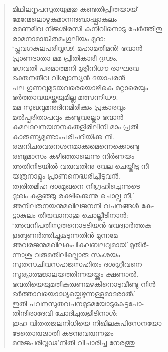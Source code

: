 \begin{verse}
മിഥിലനൃപസുതയുമതു കണ്ടതിപ്രീതയായ്\\
മേന്മേലൊഴുകുമാനന്ദബാഷ്പാകുലം\\
രമണമിവ നിജശിരസി കനിവിനൊടു ചേര്‍ത്തിതു\\
രാമനാമാങ്കിതമംഗുലീയം മുദാ:\\
‘പ്ലവഗകുലപരിവൃഢ! മഹാമതിമന്‍! ഭവാന്‍\\
പ്രാണദാതാ മമ പ്രീതികാരീ ദൃഢം.\\
ഭഗവതി പരമാത്മനി ശ്രീനിധൗ രാഘവേ\\
ഭക്തനതീവ വിശ്വാസ്യന്‍ ദയാപരന്‍\\
പല ഗുണവുമുടയവരെയൊഴികെ മറ്റാരെയും\\
ഭര്‍ത്താവയയ്ക്കയുമില്ല മത്സന്നിധൗ.\\
മമ സുഖവുമനുദിനമിരിക്കും പ്രകാരവും\\
മല്‍പ്പരിതാപവും കണ്ടുവല്ലോ ഭവാന്‍\\
കമലദലനയനനകതളിരിലിനി മാം പ്രതി\\
കാരുണ്യമുണ്ടാംപരിചറിയിക്ക നീ.\\
രജനിചരവരനശനമാക്കുമെന്നെക്കൊണ്ടു\\
രണ്ടുമാസം കഴിഞ്ഞാലെന്നു നിര്‍ണയം\\
അതിനിടയില്‍ വരുവതിനു വേല ചെയ്തീടു നീ-\\
യത്രനാളും പ്രാണനെദ്ധരിച്ചീടുവന്‍.\\
ത്വരിതമിഹ ദശമുഖനെ നിഗ്രഹിച്ചെന്നുടെ\\
ദുഃഖം കളഞ്ഞു രക്ഷിക്കെന്നു ചൊല്ലു നീ,’\\
അനിലതനയനുമഖിലജനനി വചനങ്ങള്‍ കേ-\\
ട്ടാകുലം തീരുവാനാശു ചൊല്ലീടിനാന്‍:\\
‘അവനിപതിസുതനൊടടിയന്‍ ഭവദ്വാര്‍ത്തക-\\
ളങ്ങുണര്‍ത്തിച്ചുകൂടുന്നതിന്‍ മുന്നമേ\\
അവരജനുമഖിലകപികുലബലവുമായ് മുതിര്‍-\\
ന്നാശു വരുമതിലില്ലൊരു സംശയം\\
സുതസചിവസഹജസഹിതം ദശഗ്രീവനെ\\
സൂര്യാത്മജാലയത്തിന്നയയ്ക്കും ക്ഷണാല്‍.\\
ഭവതിയെയുമതികരുണമഴകിനൊടുവീണ്ടു നിന്‍-\\
ഭര്‍ത്താവയൊദ്ധ്യയ്ക്കെഴുന്നള്ളുമാദരാല്‍.’\\
ഇതി പവനസുതവചനമുടമയോടുകേട്ടപോ-\\
തിന്ദിരാദേവി ചോദിച്ചരുളീടിനാള്‍:\\
ഇഹ വിതതജലനിധിയെ നിഖിലകപിസേനയോ-\\
ടേതൊരുജാതി കടന്നുവരുന്നതും\\
മനുജപരിവൃഢ’നിതി വിചാരിച്ച നേരത്തു\\

\end{verse}
